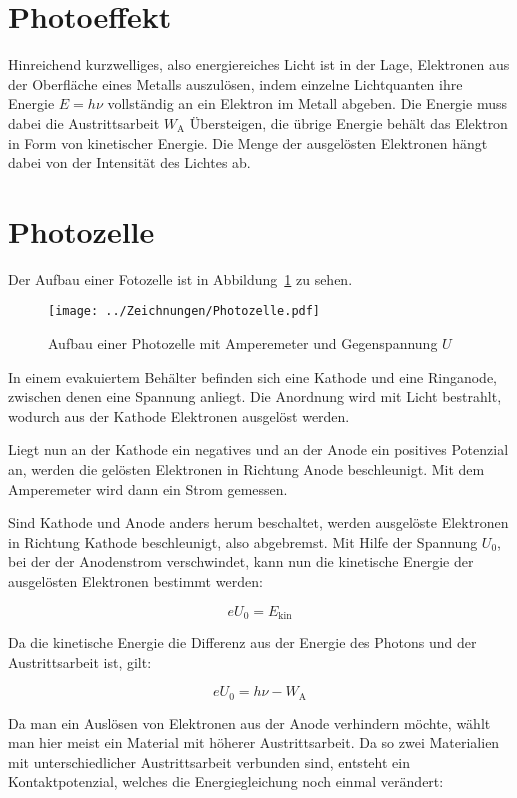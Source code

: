 \section{Photoeffekt}

Hinreichend kurzwelliges, also energiereiches Licht ist in der Lage, Elektronen
aus der Oberfläche eines Metalls auszulösen, indem einzelne Lichtquanten ihre
Energie $E = h\nu$ vollständig an ein Elektron im Metall abgeben. Die Energie
muss dabei die Austrittsarbeit $W_\text{A}$ Übersteigen, die übrige Energie
behält das Elektron in Form von kinetischer Energie. Die Menge der ausgelösten
Elektronen hängt dabei von der Intensität des Lichtes ab.

\section{Photozelle}

Der Aufbau einer Fotozelle ist in Abbildung~\ref{fig:Photozelle} zu sehen.

\begin{figure}
    \centering
    \texttt{[image: ../Zeichnungen/Photozelle.pdf]}
    \caption{%
        Aufbau einer Photozelle mit Amperemeter und Gegenspannung $U$
    }
    \label{fig:Photozelle}
\end{figure}

In einem evakuiertem Behälter befinden sich eine Kathode und eine Ringanode,
zwischen denen eine Spannung anliegt. Die Anordnung wird mit Licht bestrahlt,
wodurch aus der Kathode Elektronen ausgelöst werden.

Liegt nun an der Kathode ein negatives und an der Anode ein positives Potenzial
an, werden die gelösten Elektronen in Richtung Anode beschleunigt. Mit dem
Amperemeter wird dann ein Strom gemessen.

Sind Kathode und Anode anders herum beschaltet, werden ausgelöste Elektronen in
Richtung Kathode beschleunigt, also abgebremst. Mit Hilfe der Spannung $U_0$,
bei der der Anodenstrom verschwindet, kann nun die kinetische Energie der
ausgelösten Elektronen bestimmt werden:

\[eU_0 = E_\text{kin}\]

Da die kinetische Energie die Differenz aus der Energie des Photons und der
Austrittsarbeit ist, gilt:

\[eU_0 = h\nu-W_\text{A}\]

Da man ein Auslösen von Elektronen aus der Anode verhindern möchte, wählt man
hier meist ein Material mit höherer Austrittsarbeit. Da so zwei Materialien mit
unterschiedlicher Austrittsarbeit verbunden sind, entsteht ein
Kontaktpotenzial, welches die Energiegleichung noch einmal verändert:

